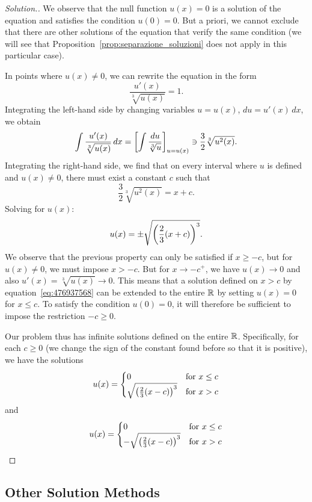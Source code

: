 \begin{proof}[Solution.]
We observe that the null function $u(x)=0$ is a solution of the equation and
satisfies the condition $u(0)=0$.
But a priori, we cannot exclude that there are other solutions of the equation
that verify the same condition (we will see that
Proposition~\ref{prop:separazione_soluzioni} does not apply in this particular
case).

In points where $u(x)\neq 0$, we can rewrite the equation in the form
\[
  \frac{u'(x)}{\sqrt[3]{u(x)}} = 1.
\]
Integrating the left-hand side by changing variables $u=u(x)$, $du = u'(x)\,
dx$, we obtain
\[
  \int \frac{u'(x)}{\sqrt[3]{u(x)}}\, dx
  = {\left[ \int \frac{du}{\sqrt[3]u} \right]}_{u=u(x)}
  \ni \frac 3 2 \sqrt[3]{u^2(x)}.
\]
Integrating the right-hand side, we find that on every interval where $u$ is
defined and $u(x)\neq 0$, there must exist a constant $c$ such that
\[
  \frac 3 2 \sqrt[3]{u^2(x)} = x + c.
\]
Solving for $u(x)$:
\begin{equation}\label{eq:476937568}
  u(x) = \pm \sqrt{{\left( \frac 2 3 (x+c) \right)}^3}.
\end{equation}
We observe that the previous property can only be satisfied if $x\ge -c$, but
for $u(x)\neq 0$, we must impose $x>-c$.
But for $x\to -c^+$, we have $u(x)\to 0$ and also $u'(x) = \sqrt[3]{u(x)}\to 0$.
This means that a solution defined on $x>c$ by equation~\eqref{eq:476937568} can
be extended to the entire ${\mathbb R}$ by setting $u(x)=0$ for $x\le c$.
To satisfy the condition $u(0)=0$, it will therefore be sufficient to impose the
restriction $-c\ge 0$.

Our problem thus has infinite solutions defined on the entire ${\mathbb R}$.
Specifically, for each $c\ge 0$ (we change the sign of the constant found before
so that it is positive), we have the solutions
\[
  u(x) = \begin{cases}
    0 & \text{for $x\le c$}\\
    \sqrt{{\left( \frac 2 3 (x-c) \right)}^3} & \text{for $x>c$}
  \end{cases}
\]
and
\[
  u(x) = \begin{cases}
    0 & \text{for $x\le c$}\\
    -\sqrt{{\left( \frac 2 3 (x-c) \right)}^3} & \text{for $x>c$}
  \end{cases}
\]
\end{proof}
\subsection{Other Solution Methods}

